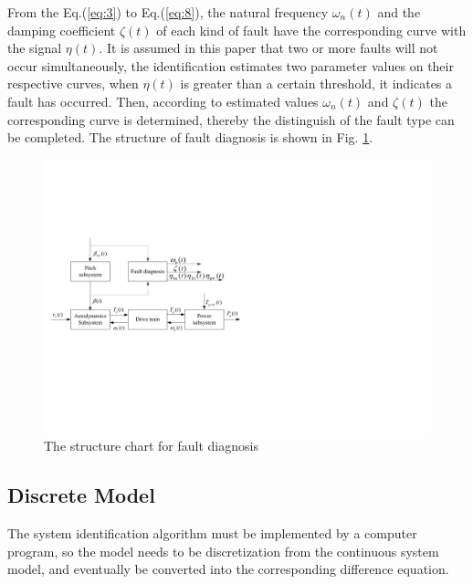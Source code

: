 \documentclass{article}
\begin{document}
From the Eq.(\ref{eq:3}) to Eq.(\ref{eq:8}),  the
natural frequency $\omega_n(t)$ and the damping coefficient $\zeta(t)$ of each kind of
fault have the corresponding curve with the signal $\eta(t)$.
It is assumed in this paper that two or more faults will not occur simultaneously, the
identification estimates two parameter values on their respective curves,
when $\eta(t)$ is greater than a certain threshold, it indicates a fault has occurred.
Then, according to estimated values $\omega_n(t)$ and $\zeta(t)$ the corresponding
curve is determined, thereby
the distinguish of the fault type can be completed. The structure of fault diagnosis
is shown in Fig. \ref{fig:3}.

\begin{figure}[!htb]
  \centering
  \includegraphics[]{fig3.pdf}
  \caption{The structure chart for fault diagnosis}
  \label{fig:3}
\end{figure}


\subsection{Discrete Model}

The system identification algorithm must be implemented by a computer program,
so the model needs to be discretization from the continuous system model, and
eventually be converted into the corresponding difference equation.
\end{document}
